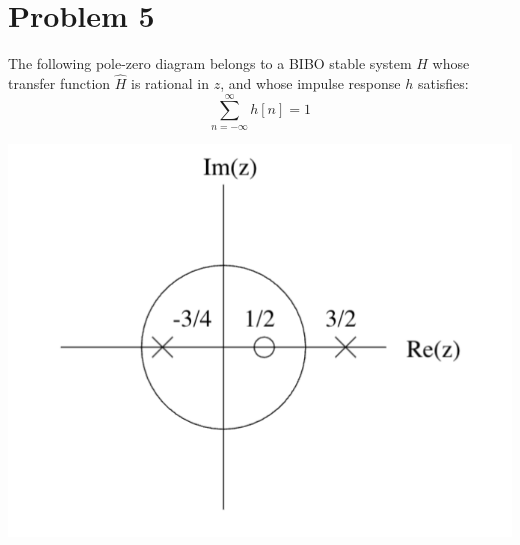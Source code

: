 \documentclass[10pt]{article}
\begin{document}
	\section*{Problem 5}
	The following pole-zero diagram belongs to a BIBO stable system \( H \) whose transfer function \( \hat{H} \)
	is rational in \( z \), and whose impulse response \( h \) satisfies:
	\[
		\sum_{n=-\infty}^{\infty} h[n] = 1
	\] 
	\begin{center}
		\includegraphics[scale=0.8]{diagram2.png}
	\end{center}
\end{document}
